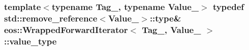 \label{classeos_1_1WrappedForwardIterator_ac7ba4ace12142ac73d97df5d555a4c18}
\hypertarget{classeos_1_1WrappedForwardIterator_a89335178f8e6e7a0a48ef7a5001498ed}{
\subsubsection[{value\_\-type}]{\setlength{\rightskip}{0pt plus 5cm}template$<$typename Tag\_\-, typename Value\_\-$>$ typedef std::remove\_\-reference$<$Value\_\-$>$::type\& {\bf eos::WrappedForwardIterator}$<$ Tag\_\-, Value\_\- $>$::{\bf value\_\-type}}}
\label{classeos_1_1WrappedForwardIterator_a89335178f8e6e7a0a48ef7a5001498ed}


